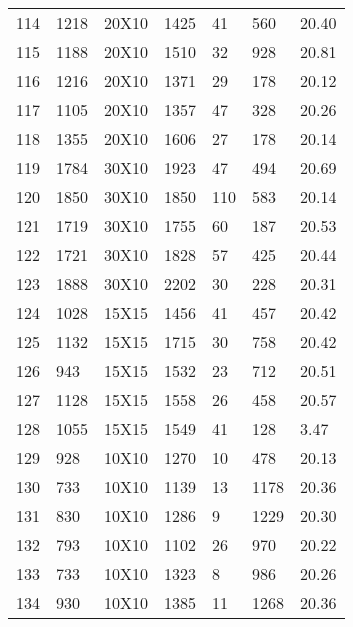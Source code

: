 \documentclass[14pt]{acmsiggraph}
\begin{document}
\begin{table}[h!]
\begin{center}
{\begin{tabular}{||lllllll}
					114 & 1218 & 20X10  & \cellcolor[rgb]{0.62,0.76,0.35}1425 & 41  & 560  & 20.40 \\
					115 & 1188 & 20X10  & \cellcolor[rgb]{0.74,0.8,0.4}1510   & 32  & 928  & 20.81 \\
					116 & 1216 & 20X10  & \cellcolor[rgb]{0.58,0.73,0.33}1371 & 29  & 178  & 20.12 \\
					117 & 1105 & 20X10  & \cellcolor[rgb]{0.69,0.78,0.38}1357 & 47  & 328  & 20.26 \\
					118 & 1355 & 20X10  & \cellcolor[rgb]{0.64,0.76,0.36}1606 & 27  & 178  & 20.14 \\
					119 & 1784 & 30X10  & \cellcolor[rgb]{0.52,0.71,0.31}1923 & 47  & 494  & 20.69 \\
					120 & 1850 & 30X10  & \cellcolor[rgb]{0.43,0.67,0.27}1850 & 110 & 583  & 20.14 \\
					121 & 1719 & 30X10  & \cellcolor[rgb]{0.45,0.68,0.28}1755 & 60  & 187  & 20.53 \\
					122 & 1721 & 30X10  & \cellcolor[rgb]{0.5,0.7,0.3}1828    & 57  & 425  & 20.44 \\
					123 & 1888 & 30X10  & \cellcolor[rgb]{0.62,0.75,0.35}2202 & 30  & 228  & 20.31 \\
					124 & 1028 & 15X15  & \cellcolor[rgb]{0.9,0.87,0.47}1456  & 41  & 457  & 20.42 \\
					125 & 1132 & 15X15  & \cellcolor[rgb]{1,0.89,0.5}1715     & 30  & 758  & 20.42 \\
					126 & 943  & 15X15  & \cellcolor[rgb]{1,0.69,0.39}1532    & 23  & 712  & 20.51 \\
					127 & 1128 & 15X15  & \cellcolor[rgb]{0.86,0.86,0.45}1558 & 26  & 458  & 20.57 \\
					128 & 1055 & 15X15  & \cellcolor[rgb]{0.96,0.9,0.5}1549   & 41  & 128  & 3.47  \\
					129 & 928  & 10X10  & \cellcolor[rgb]{0.85,0.85,0.45}1270 & 10  & 478  & 20.13 \\
					130 & 733  & 10X10  & \cellcolor[rgb]{1,0.82,0.46}1139    & 13  & 1178 & 20.36 \\
					131 & 830  & 10X10  & \cellcolor[rgb]{1,0.83,0.46}1286    & 9   & 1229 & 20.30 \\
					132 & 793  & 10X10  & \cellcolor[rgb]{0.87,0.86,0.46}1102 & 26  & 970  & 20.22 \\
					133 & 733  & 10X10  & \cellcolor[rgb]{1,0.36,0.2}1323     & 8   & 986  & 20.26 \\
					134 & 930  & 10X10  & \cellcolor[rgb]{0.98,0.91,0.5}1385  & 11  & 1268 & 20.36 \\

\end{tabular}}
\end{center}
\end{table}
\end{document}
